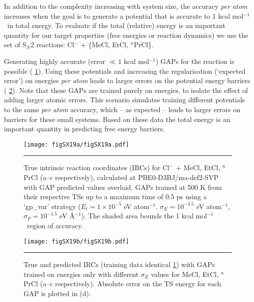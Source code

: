 \documentclass[11pt]{article}
\numberwithin{equation}{subsection}
\newcommand{\kcal}{kcal mol$^{-1}$}
\begin{document}
In addition to the complexity increasing with system size, the accuracy \emph{per atom} increases when the goal is to generate a potential that is accurate to 1 \kcal~in total energy. To evaluate if the total (relative) energy is an important quantity for our target properties (free energies or reaction dynamics) we use the set of S${}_N$2 reactions: Cl$^{-}$ + \{MeCl, EtCl, ${}^n$PrCl\}. 

Generating highly accurate (error $\ll 1$ \kcal) GAPs for the reaction is possible (\figurename{ \ref{fig::SX19a}}). Using these potentials and increasing the regularisation (`expected error') on energies \emph{per atom} leads to larger errors on the potential energy  barriers (\figurename{ \ref{fig::SX19b}}). Note that these GAPs are trained purely on energies, to isolate the effect of adding larger atomic errors. This scenario simulates training different potentials to the same \emph{per atom} accuracy, which -- as expected -- leads to larger errors on barriers for these small systems. Based on these data the total energy is an important quantity in predicting {\large {\color{red} free}} energy barriers.


\begin{figure}[h!]
	\centering
	\vspace{0.5cm}
	\texttt{[image: figSX19a/figSX19a.pdf]}
	\vspace{0.1cm}
	\hrule
	\vspace{0.1cm}
	\caption{True intrinsic reaction coordinates (IRCs) for Cl$^{-}$ + MeCl, EtCl, ${}^n$PrCl  (a--c respectively), calculated at PBE0-D3BJ/ma-def2-SVP with GAP predicted values overlaid. GAPs trained at 500 K from their respective TSs up to a maximum time of 0.5 ps using a `gp\_var' strategy ($E_t = 1\times10^{-5}$ eV atom${}^{-1}$. $\sigma_E = 10^{-3.5}$ eV atom${}^{-1}$, $\sigma_F = 10^{-1.5}$ eV \AA${}^{-1}$). The shaded area bounds the 1 \kcal~region of accuracy.}
	\label{fig::SX19a}
\end{figure}


\begin{figure}[h!]
	\centering
	\texttt{[image: figSX19b/figSX19b.pdf]}
	\vspace{0.0cm}
	\hrule
	\vspace{0.1cm}
	\caption{True and predicted IRCs (training data identical \figurename{ \ref{fig::SX19a}}) with GAPs trained on energies only with different $\sigma_E$ values for MeCl, EtCl, ${}^n$PrCl  (a--c respectively). Absolute error on the TS  energy for each GAP is plotted in (d).}
	\label{fig::SX19b}
\end{figure}
\end{document}
